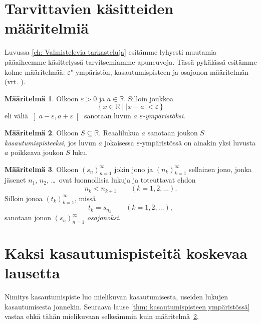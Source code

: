 \documentclass[a4paper,12pt,leqno,oneside]{report} %
\theoremstyle{plain}
\theoremstyle{definition}
\newtheorem{maaritelma}{Määritelmä}[chapter]
\theoremstyle{remark}
\numberwithin{equation}{chapter}
\newcommand*{\Rset}{\mathbb{R}}  %
\newcommand*{\abs}[1]{\left\lvert#1\right\rvert}   %
\begin{document}
\section{Tarvittavien käsitteiden määritelmiä}

Luvussa \ref{ch: Valmistelevia tarkasteluja} esitämme lyhyesti muutamia pääaiheemme käsittelyssä tarvitsemiamme apuneuvoja. Tässä pykälässä esitämme kolme määritelmää: $\varepsilon$"-ympäristön,
kasautumispisteen ja osajonon määritelmän (vrt. \cite[s.~32--33]{Mathman}).

\begin{maaritelma}
Olkoon $\varepsilon > 0$ ja $a\in\Rset$. Silloin joukkoa
\[
    \{\, x\in\Rset \mid \abs{x - a} < \varepsilon \,\}
\]
eli väliä $\left]a-\varepsilon, a+\varepsilon\right[$ sanotaan luvun
$a$ \emph{$\varepsilon$-ympäristöksi}.
\end{maaritelma}

\begin{maaritelma}\label{def: kasautumispiste}
Olkoon $S\subseteq\Rset$. Reaalilukua $a$ sanotaan joukon $S$ \emph{kasautumispisteeksi}, jos luvun $a$ jokaisessa $\varepsilon$-ympäristössä on ainakin yksi luvusta $a$ poikkeava joukon $S$ luku.
\end{maaritelma}

\begin{maaritelma}
Olkoon $(s_n)_{n=1}^\infty$ jokin jono ja $(n_k)_{k=1}^\infty$ sellainen jono, jonka jäsenet $n_1$, $n_2$, \dots\ ovat luonnollisia lukuja ja toteuttavat ehdon
\begin{equation}
    n_k < n_{k+1} \qquad (k = 1,2,\dots).
\end{equation}
Silloin jonoa $(t_k)_{k=1}^\infty$, missä
\begin{equation}
    t_k = s_{n_k} \qquad (k = 1,2,\dots),
\end{equation}
sanotaan jonon $(s_n)_{n=1}^\infty$ \emph{osajonoksi}.
\end{maaritelma}


\section{Kaksi kasautumispisteitä koskevaa lausetta}

Nimitys kasautumispiste luo mielikuvan kasautumisesta, useiden lukujen kasautumisesta jonnekin. Seuraava lause \ref{thm: kasautumispisteen ympäristössä} vastaa ehkä tähän mielikuvaan selkeämmin kuin määritelmä~\ref{def: kasautumispiste}.
\end{document}
